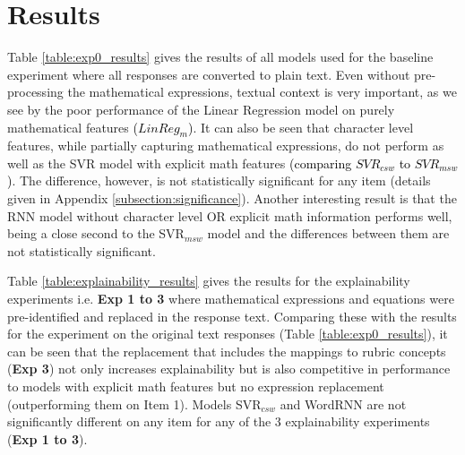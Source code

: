 \documentclass[11pt,a4paper]{article}
\newcommand{\AC}{\textcolor{black}} %
\begin{document}
\section{Results}
\label{section:results}


Table \ref{table:exp0_results} gives the results of all models used for the baseline experiment where all responses are converted to plain text. Even without pre-processing the mathematical expressions, textual context is very important, as we see by the poor performance of the Linear Regression model on purely mathematical features \AC{($LinReg_{m}$)}. It can also be seen that character level features, while partially capturing mathematical expressions, do not perform as well as the SVR model with explicit math features \AC{(comparing $SVR_{csw}$ to $SVR_{msw}$)}. The difference, however, is not statistically significant for any item (details given in Appendix \ref{subsection:significance}). Another interesting result is that the RNN model without character level OR explicit math information performs well, being a close second to the SVR$_{msw}$ model and the differences between them are not statistically significant. 

Table \ref{table:explainability_results} gives the results for the explainability experiments i.e. \textbf{Exp 1 to 3} where mathematical expressions and equations were pre-identified and replaced in the response text. Comparing these with the results for the experiment on the original text responses (Table \ref{table:exp0_results}), it can be seen that the replacement that includes the mappings to rubric concepts (\textbf{Exp 3}) not only increases explainability but is also competitive in performance to models with explicit math features but no expression replacement (outperforming them on Item 1). Models SVR$_{csw}$ and WordRNN are not significantly different on any item for any of the 3 explainability experiments (\textbf{Exp 1 to 3}). 
\end{document}
